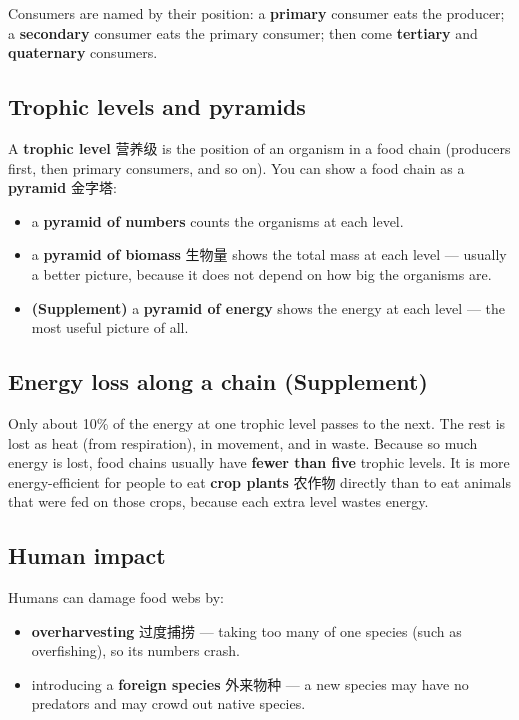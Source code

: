 \documentclass[11pt]{article}
\begin{document}
Consumers are named by their position: a \textbf{primary} consumer eats the producer; a \textbf{secondary} consumer eats the primary consumer; then come \textbf{tertiary} and \textbf{quaternary} consumers.

\subsection*{Trophic levels and pyramids}

A \textbf{trophic level} 营养级 is the position of an organism in a food chain (producers first, then primary consumers, and so on). You can show a food chain as a \textbf{pyramid} 金字塔:

\begin{itemize}
\item a \textbf{pyramid of numbers} counts the organisms at each level.

\item a \textbf{pyramid of biomass} 生物量 shows the total mass at each level — usually a better picture, because it does not depend on how big the organisms are.

\item \textbf{(Supplement)} a \textbf{pyramid of energy} shows the energy at each level — the most useful picture of all.

\end{itemize}

\subsection*{Energy loss along a chain (Supplement)}

Only about 10\% of the energy at one trophic level passes to the next. The rest is lost as heat (from respiration), in movement, and in waste. Because so much energy is lost, food chains usually have \textbf{fewer than five} trophic levels. It is more energy-efficient for people to eat \textbf{crop plants} 农作物 directly than to eat animals that were fed on those crops, because each extra level wastes energy.

\subsection*{Human impact}

Humans can damage food webs by:

\begin{itemize}
\item \textbf{overharvesting} 过度捕捞 — taking too many of one species (such as overfishing), so its numbers crash.

\item introducing a \textbf{foreign species} 外来物种 — a new species may have no predators and may crowd out native species.

\end{itemize}
\end{document}
